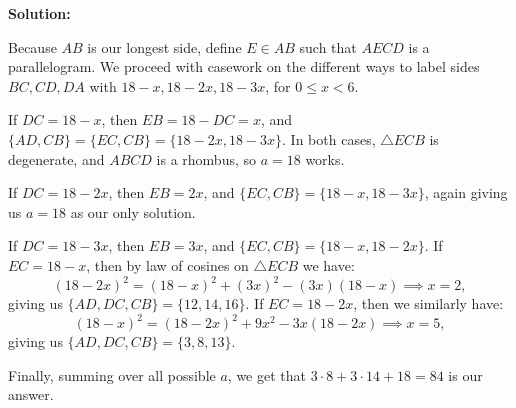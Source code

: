 
\begin{solution}
\textbf{Solution}\textbf{:}\V

Because $AB$ is our longest side, define $E\in AB$ such that $AECD$ is a parallelogram. We proceed with casework on the different ways to label sides $BC, CD, DA$ with $18-x, 18-2x, 18-3x$, for $0\leq x < 6$.\V

If $DC=18-x$, then $EB = 18-DC=x$, and $\{AD, CB\} = \{EC, CB\} = \{18-2x, 18-3x\}$. In both cases, $\triangle{ECB}$ is degenerate, and $ABCD$ is a rhombus, so $a=18$ works.\V

If $DC=18-2x$, then $EB=2x$, and $\{EC, CB\} = \{18-x, 18-3x\}$, again giving us $a=18$ as our only solution.\V

If $DC = 18-3x$, then $EB=3x$, and $\{EC, CB\} = \{18-x, 18-2x\}$. If $EC = 18-x$, then by law of cosines on $\triangle{ECB}$ we have: 
\[(18-2x)^2 = (18-x)^2+(3x)^2-(3x)(18-x)\implies x=2,\]
giving us $\{AD, DC, CB\} = \{12, 14, 16\}$. If $EC = 18-2x$, then we similarly have: 
\[(18-x)^2=(18-2x)^2+9x^2-3x(18-2x)\implies x=5,\]
giving us $\{AD, DC, CB\} = \{3, 8, 13\}$. \V

Finally, summing over all possible $a$, we get that $3\cdot 8 + 3\cdot 14 + 18 = 84$ is our answer.
\end{solution}